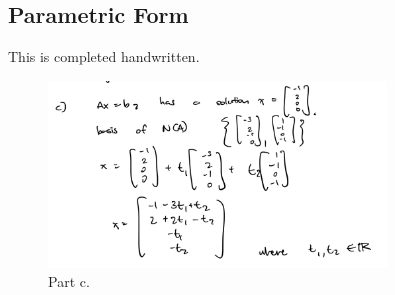 \documentclass{article}
\theoremstyle{named}
\begin{document}
\subsection{Parametric Form}

This is completed handwritten.

\begin{figure}[ht]
    \centering
    \includegraphics[width=0.8\textwidth]{img4.png}
    \caption{Part c.}
\end{figure}
\end{document}
